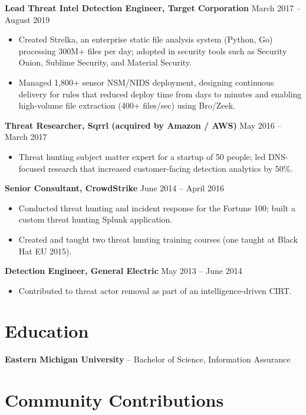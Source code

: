 \documentclass[10pt,letterpaper]{article}
\begin{document}
\textbf{Lead Threat Intel Detection Engineer, Target Corporation} \hfill March 2017 -- August 2019
\begin{itemize}
  \item Created Strelka, an enterprise static file analysis system (Python, Go) processing 300M+ files per day; adopted in security tools such as Security Onion, Sublime Security, and Material Security.
  \item Managed 1,800+ sensor NSM/NIDS deployment, designing continuous delivery for rules that reduced deploy time from days to minutes and enabling high-volume file extraction (400+ files/sec) using Bro/Zeek.
\end{itemize}

\pagebreak
\textbf{Threat Researcher, Sqrrl (acquired by Amazon / AWS)} \hfill May 2016 -- March 2017
\begin{itemize}
  \item Threat hunting subject matter expert for a startup of 50 people; led DNS-focused research that increased customer-facing detection analytics by 50\%.
\end{itemize}

\textbf{Senior Consultant, CrowdStrike} \hfill June 2014 -- April 2016
\begin{itemize}
  \item Conducted threat hunting and incident response for the Fortune 100; built a custom threat hunting Splunk application.
  \item Created and taught two threat hunting training courses (one taught at Black Hat EU 2015).
\end{itemize}

\textbf{Detection Engineer, General Electric} \hfill May 2013 -- June 2014
\begin{itemize}
  \item Contributed to threat actor removal as part of an intelligence-driven CIRT.
\end{itemize}

\section{Education}
\textbf{Eastern Michigan University} -- Bachelor of Science, Information Assurance

\section{Community Contributions}
\end{document}
